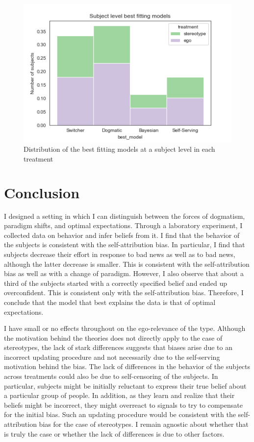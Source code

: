 \documentclass[
  12pt,
]{article}
\begin{document}
\begin{figure}
\hypertarget{fig:best-models}{%
\centering
\includegraphics{../figures/model_fit_histogram.png}
\caption{Distribution of the best fitting models at a subject level in
each treatment}\label{fig:best-models}
}
\end{figure}

\hypertarget{conclusion}{%
\section{Conclusion}\label{conclusion}}

I designed a setting in which I can distinguish between the forces of
dogmatism, paradigm shifts, and optimal expectations. Through a
laboratory experiment, I collected data on behavior and infer beliefs
from it. I find that the behavior of the subjects is consistent with the
self-attribution bias. In particular, I find that subjects decrease
their effort in response to bad news as well as to bad news, although
the latter decrease is smaller. This is consistent with the
self-attribution bias as well as with a change of paradigm. However, I
also observe that about a third of the subjects started with a correctly
specified belief and ended up overconfident. This is consistent only
with the self-attribution bias. Therefore, I conclude that the model
that best explains the data is that of optimal expectations.

I have small or no effects throughout on the ego-relevance of the type.
Although the motivation behind the theories does not directly apply to
the case of stereotypes, the lack of stark differences suggests that
biases arise due to an incorrect updating procedure and not necessarily
due to the self-serving motivation behind the bias. The lack of
differences in the behavior of the subjects across treatments could also
be due to self-censoring of the subjects. In particular, subjects might
be initially reluctant to express their true belief about a particular
group of people. In addition, as they learn and realize that their
beliefs might be incorrect, they might overreact to signals to try to
compensate for the initial bias. Such an updating procedure would be
consistent with the self-attribution bias for the case of stereotypes. I
remain agnostic about whether that is truly the case or whether the lack
of differences is due to other factors.
\end{document}

